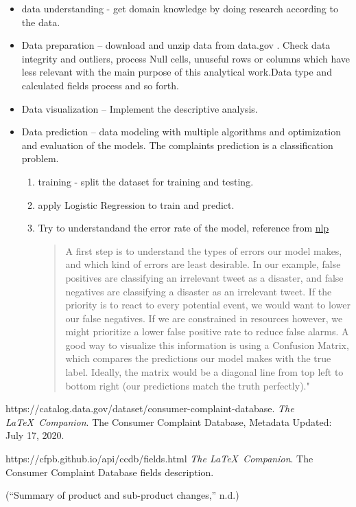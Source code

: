 \documentclass[conference]{IEEEtran}
\begin{document}
\begin{itemize}
\item data understanding - get domain knowledge by doing research according to the data.
\item Data preparation – download and unzip data from data.gov . Check data integrity and outliers, process Null cells, unuseful rows or columns which have less relevant with the main purpose of this analytical work.Data type and calculated fields process and so forth.
\item Data visualization – Implement the descriptive analysis.
\item Data prediction – data modeling with multiple algorithms and optimization and evaluation of the models. The complaints prediction is a classification problem.
\begin{enumerate}
\item training - split the dataset for training and testing. 
\item apply Logistic Regression to train and predict. 
\item Try to understandand the error rate of the model, reference from \href{https://www.kdnuggets.com/2019/01/solve-90-nlp-problems-step-by-step-guide.html}{nlp} \begin{quotation} A first step is to understand the types of errors our model makes, and which kind of errors are least desirable. In our example, false positives are classifying an irrelevant tweet as a disaster, and false negatives are classifying a disaster as an irrelevant tweet. If the priority is to react to every potential event, we would want to lower our false negatives. If we are constrained in resources however, we might prioritize a lower false positive rate to reduce false alarms. A good way to visualize this information is using a Confusion Matrix, which compares the predictions our model makes with the true label. Ideally, the matrix would be a diagonal line from top left to bottom right (our predictions match the truth perfectly)."\end{quotation}

\end{enumerate}

\end{itemize}

\begin{thebibliography}{9}
https://catalog.data.gov/dataset/consumer-complaint-database. 
\textit{The \LaTeX\ Companion}. 
The Consumer Complaint Database, Metadata Updated: July 17, 2020.

https://cfpb.github.io/api/ccdb/fields.html
\textit{The \LaTeX\ Companion}. 
The Consumer Complaint Database fields description.

(“Summary of product and sub-product changes,” n.d.) 

\end{thebibliography}
\end{document}
